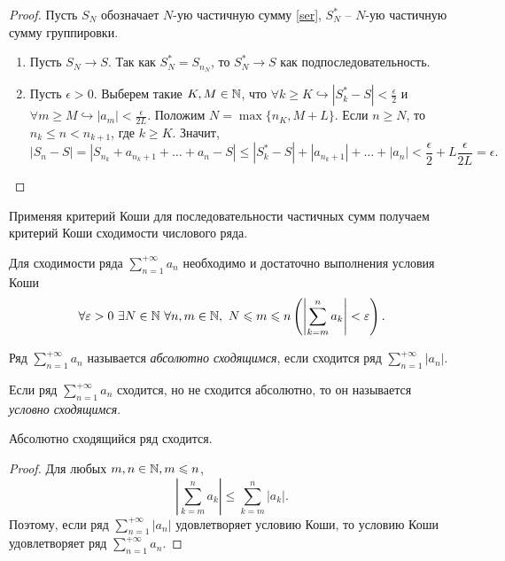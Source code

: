 \begin{proof}
    Пусть $S_N$ обозначает $N$-ую частичную сумму \ref{ser}, $S_{N}^{*}$ -- $N$-ую частичную сумму группировки.
    \begin{enumerate}
        \item Пусть $S_{N} \to S$. Так как $S_{N}^{*} = S_{n_{N}}$, то $S_{N}^{*} \to S$ как подпоследовательность.
        
        \item Пусть $\epsilon > 0$. Выберем такие $K, M \in \mathbb{N}$, что $\forall k \geq K \hookrightarrow \left| S_{k}^{*} - S \right| < \frac{\epsilon}{2}$ и $\forall m \geq M \hookrightarrow |a_{m}| < \frac{\epsilon}{2L}$. Положим $N = \max\{n_{K}, M + L\}$. Если $n \geq N$, то $n_k \leq n < n_{k+1}$, где $k \geq K$. Значит, 
        \[\left|S_{n} - S\right| = \left| S_{n_{k}} + a_{n_{k}+1} + \dots + a_{n} - S \right| \leq \left|S_{k}^{*} - S\right| + |a_{n_{k} + 1}| + \dots + |a_{n}| < \frac{\epsilon}{2} + L\frac{\epsilon}{2L} = \epsilon.\]
    \end{enumerate}
\end{proof}

Применяя критерий Коши для последовательности частичных сумм получаем критерий Коши сходимости числового ряда.

\begin{theorem}
    Для сходимости ряда $\sum_{n = 1}^{+\infty}a_{n}$ необходимо и достаточно выполнения условия Коши
    \[\forall \epsilon > 0 \ \exists N \in \N \ \forall n, m \in \N, \ N \leq m \leq n \left( \left| \sum_{k = m}^{n}a_{k} \right| < \epsilon \right).\]
\end{theorem}

\begin{definition}
    Ряд $\sum_{n = 1}^{+\infty}a_{n}$ называется \textit{абсолютно сходящимся}, если сходится ряд $\sum_{n = 1}^{+\infty}|a_{n}|$.

    Если ряд $\sum_{n = 1}^{+\infty}a_{n}$ сходится, но не сходится абсолютно, то он называется \textit{условно сходящимся}. 
\end{definition}

\begin{corollary}
    Абсолютно сходящийся ряд сходится.
\end{corollary}

\begin{proof}
    Для любых $m, n \in \mathbb{N}, m \leqslant n$,
    \[\left|\sum_{k = m}^{n} a_{k}\right| \leq \sum_{k = m}^{n}|a_{k}|.\]
    Поэтому, если ряд $\sum_{n = 1}^{+\infty} |a_{n}|$ удовлетворяет условию Коши, то условию Коши удовлетворяет ряд $\sum_{n = 1}^{+\infty}a_{n}$. 
\end{proof}

